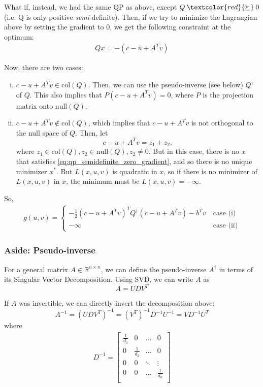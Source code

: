 \documentclass[11pt]{article}
\newcommand{\R}{\mathbb{R}}
\begin{document}
What if, instead, we had the same QP as above, except $Q
\mathbin{\textcolor{red}{\succeq}} 0$ (i.e. Q is only positive
\textit{semi}-definite).  Then, if we try to minimize the Lagrangian above by
setting the gradient to 0, we get the following constraint at the optimum:
\begin{align}
Qx = -(c - u + A^T v) \label{eq:qp_semidefinite_zero_gradient}
\end{align}

Now, there are two cases:
\begin{enumerate}[(i)]
\item $c - u + A^T v \in \text{col}(Q)$. Then, we can use the pseudo-inverse (see below)
      $Q^{\dagger}$ of $Q$. This also implies that $P \left( c - u + A^T v \right) = 0$, where $P$ is the projection matrix onto $\text{null}\left(Q\right)$.
\item $c - u + A^T v \not\in \text{col}(Q)$, which implies that $c - u + A^T v$
      is not orthogonal to the null space of $Q$. Then, let
      \[ c - u + A^T v = z_1 + z_2, \]
      where $z_1 \in \text{col}(Q), z_2 \in \text{null}(Q), z_2 \neq 0$. But
      in this case, there is no $x$ that satisfies
      \cref{eq:qp_semidefinite_zero_gradient}, and so there is no unique
      minimizer $x^*$. But $L(x, u, v)$ is quadratic in $x$, so if there is no
      minimizer of $L(x, u, v)$ in $x$, the minimum must be $L(x, u, v) =
      -\infty$.
\end{enumerate}

So,
\begin{align*}
g(u, v) = \begin{cases}
-\frac{1}{2} (c - u + A^T v)^T Q^{\dagger} (c - u + A^Tv) - b^T v ~&\text{case (i)} \\
-\infty ~&\text{case (ii)}
\end{cases}
\end{align*}

\subsubsection{Aside: Pseudo-inverse}
For a general matrix $A \in \R^{n\times n}$, we can define the pseudo-inverse
$A^{\dagger}$ in terms of its Singular Vector Decomposition. Using SVD, we can
write $A$ as
\[ A = U D V^T \]

If $A$ was invertible, we can directly invert the decomposition above:
\[ A^{-1} = (U D V^T)^{-1} = (V^T)^{-1} D^{-1} U^{-1} = V D^{-1} U^T \]
where
\begin{align*}
D^{-1} = \begin{bmatrix}
\frac{1}{d_1} & 0 & \dots & 0 \\
0 & \frac{1}{d_2} & \dots & 0 \\
0 & 0 & \ddots & \vdots \\
0 & 0 & \dots & \frac{1}{d_n} \\
\end{bmatrix}
\end{align*}
\end{document}

